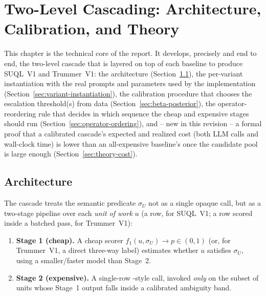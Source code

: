 \chapter{Two-Level Cascading: Architecture, Calibration, and Theory}
\label{chap:cascading}

This chapter is the technical core of the report. It develops, precisely
and end to end, the two-level cascade that is layered on top of each
baseline to produce SUQL~V1 and Trummer~V1: the architecture
(Section~\ref{sec:cascade-architecture}), the per-variant instantiation
with the real prompts and parameters used by the implementation
(Section~\ref{sec:variant-instantiation}), the calibration procedure
that chooses the escalation threshold(s) from data
(Section~\ref{sec:beta-posterior}), the operator-reordering rule that
decides in which sequence the cheap and expensive stages should run
(Section~\ref{sec:operator-ordering}), and -- new in this revision -- a
formal proof that a calibrated cascade's expected and realized cost
(both LLM calls and wall-clock time) is lower than an all-expensive
baseline's once the candidate pool is large enough
(Section~\ref{sec:theory-cost}).

\section{Architecture}
\label{sec:cascade-architecture}

The cascade treats the semantic predicate $\sigma_U$ not as a single
opaque call, but as a two-stage pipeline over each \emph{unit of work}
$u$ (a row, for SUQL~V1; a row scored inside a batched pass, for
Trummer~V1):

\begin{enumerate}
  \item \textbf{Stage 1 (cheap).} A cheap scorer $f_1(u, \sigma_U) \to p
        \in (0,1)$ (or, for Trummer~V1, a direct three-way label) estimates
        whether $u$ satisfies $\sigma_U$, using a smaller/faster model
        than Stage~2.
  \item \textbf{Stage 2 (expensive).} A single-row \answerfn{}-style
        call, invoked \emph{only} on the subset of units whose Stage~1
        output falls inside a calibrated ambiguity band.
\end{enumerate}

